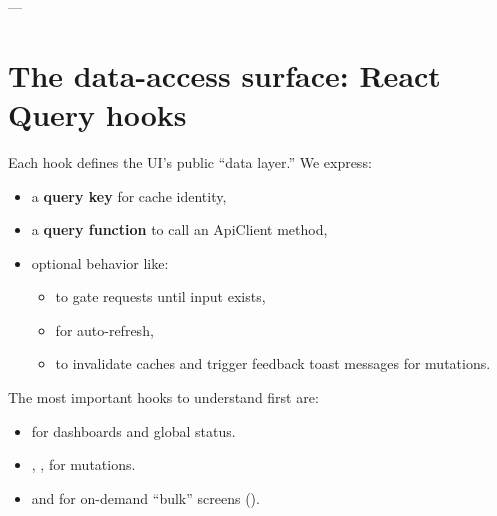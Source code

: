 ---

\section{The data-access surface: React Query hooks}
\label{sec:react-query-hooks}

Each hook defines the UI's public ``data layer.'' We express:

\begin{itemize}
  \item a \textbf{query key} for cache identity,
  \item a \textbf{query function} to call an ApiClient method,
  \item optional behavior like:
    \begin{itemize}
      \item {} to gate requests until input exists,
      \item {} for auto-refresh,
      \item {} to invalidate caches and trigger feedback toast messages for mutations.
    \end{itemize}
\end{itemize}

The most important hooks to understand first are:

\begin{itemize}
  \item {} for dashboards and global status.
  \item {}, ,  for mutations.
  \item {} and  for on-demand ``bulk'' screens ().
\end{itemize}

